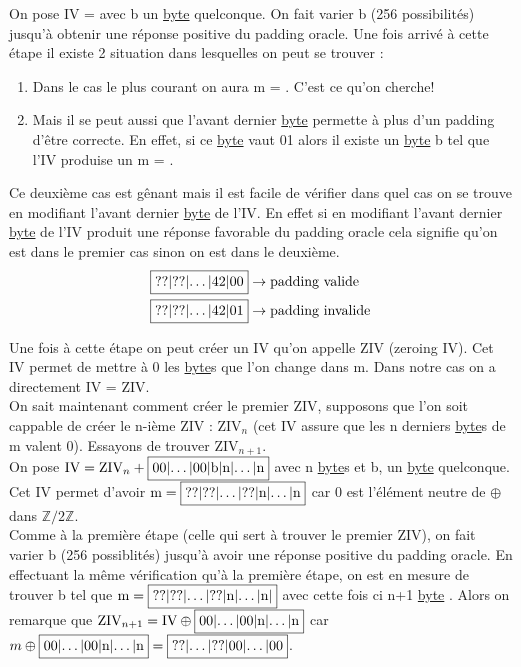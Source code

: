 \documentclass[a4paper, 12pt]{article}
\begin{document}
On pose IV =  avec b un \hyperref[byte]{byte} quelconque. On fait varier b (256 possibilités) jusqu'à obtenir une réponse positive du padding oracle. Une fois arrivé à cette étape il existe 2 situation dans lesquelles on peut se trouver :

\begin{enumerate}
	\item Dans le cas le plus courant on aura m = . C'est ce qu'on cherche!
	\item Mais il se peut aussi que l'avant dernier \hyperref[byte]{byte} permette à plus d'un padding d'être correcte. En effet, si ce \hyperref[byte]{byte} vaut 01 alors il existe un \hyperref[byte]{byte} b tel que l'IV produise un m = .
\end{enumerate}

Ce deuxième cas est gênant mais il est facile de vérifier dans quel cas on se trouve en modifiant l'avant dernier \hyperref[byte]{byte} de l'IV.
En effet si en modifiant l'avant dernier \hyperref[byte]{byte} de l'IV produit une réponse favorable du padding oracle cela signifie qu'on est dans le premier cas sinon on est dans le deuxième. 
\begin{align*}
	&\fbox{??|??|$\dots$|42|00} \rightarrow \text{padding valide}\\
	&\fbox{??|??|$\dots$|42|01} \rightarrow \text{padding invalide}
\end{align*}

Une fois à cette étape on peut créer un IV qu'on appelle ZIV (zeroing IV). Cet IV permet de mettre à 0 les \hyperref[byte]{byte}s que l'on change dans m. Dans notre cas on a directement IV = ZIV. \\

On sait maintenant comment créer le premier ZIV, supposons que l'on soit cappable de créer le n-ième ZIV : $\text{ZIV}_n$ (cet IV assure que les n derniers \hyperref[byte]{byte}s de m valent 0). Essayons de trouver $\text{ZIV}_{n+1}$. \\

On pose $\text{IV} = \text{ZIV}_n + \fbox{00|$\dots$|00|b|n|$\dots$|n}$ avec n \hyperref[byte]{byte}s  et b, un \hyperref[byte]{byte} quelconque. Cet IV permet d'avoir $\text{m} = \fbox{??|??|\dots|??|n|$\dots$|n}$ car 0 est l'élément neutre de $\oplus$ dans $\mathbb{Z}/2\mathbb{Z}$. \\
Comme à la première étape (celle qui sert à trouver le premier ZIV), on fait varier b (256 possiblités) jusqu'à avoir une réponse positive du padding oracle. En effectuant la même vérification qu'à la première étape, on est en mesure de trouver b tel que $\text{m} = \fbox{??|??|$\dots$|??|n|$\dots$|n|}$ avec cette fois ci n+1 \hyperref[byte]{byte} . Alors on remarque que $\text{ZIV}_{n+1} = \text{IV} \oplus \fbox{00|$\dots$|00|n|$\dots$|n}$ car $m \oplus \fbox{00|$\dots$|00|n|$\dots$|n} = \fbox{??|$\dots$|??|00|$\dots$|00}$. \\
\end{document}
